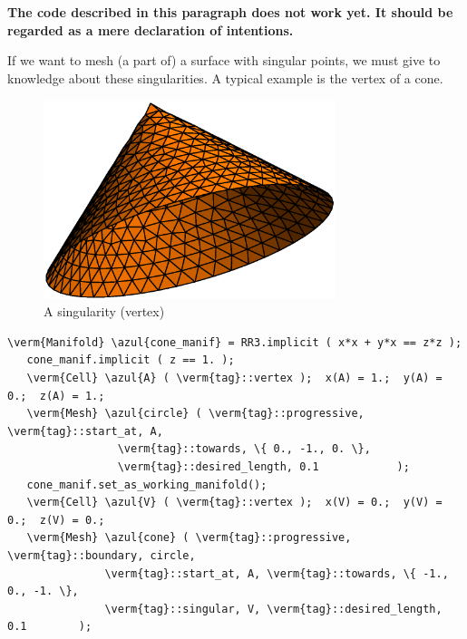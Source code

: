 \section{~~}\label{\numb section 3.\numb parag 20}

{\normalfont\bfseries The code described in this paragraph does not work yet.
It should be regarded as a mere declaration of intentions.}
\medskip

If we want to mesh (a part of) a surface with singular points, we must give to {\maniFEM}
knowledge about these singularities.
A typical example is the vertex of a cone.

\begin{figure} \centering
 \includegraphics[width=85mm]{cone}
  \caption{A singularity (vertex)}
  \label{\numb section 3.\numb fig 8}
\end{figure}

\begin{Verbatim}[commandchars=\\\{\},formatcom=\small\tt,frame=single,
   label=parag-\ref{\numb section 3.\numb parag 20}.cpp,rulecolor=\color{coment},
   baselinestretch=0.94,framesep=2mm                                            ]
   \verm{Manifold} \azul{cone_manif} = RR3.implicit ( x*x + y*x == z*z );
   cone_manif.implicit ( z == 1. );
   \verm{Cell} \azul{A} ( \verm{tag}::vertex );  x(A) = 1.;  y(A) = 0.;  z(A) = 1.;
   \verm{Mesh} \azul{circle} ( \verm{tag}::progressive, \verm{tag}::start_at, A,
                 \verm{tag}::towards, \{ 0., -1., 0. \},
                 \verm{tag}::desired_length, 0.1            );
   cone_manif.set_as_working_manifold();
   \verm{Cell} \azul{V} ( \verm{tag}::vertex );  x(V) = 0.;  y(V) = 0.;  z(V) = 0.;
   \verm{Mesh} \azul{cone} ( \verm{tag}::progressive, \verm{tag}::boundary, circle,
               \verm{tag}::start_at, A, \verm{tag}::towards, \{ -1., 0., -1. \},
               \verm{tag}::singular, V, \verm{tag}::desired_length, 0.1        );
\end{Verbatim}


